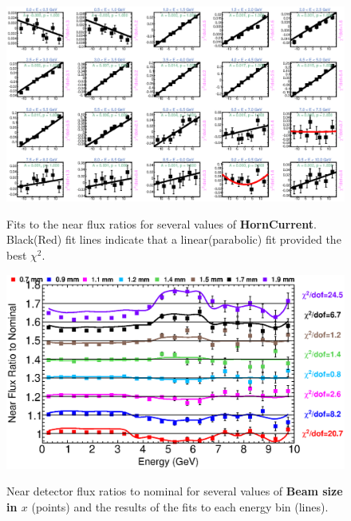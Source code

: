 {\begin{figure}[ht]
  \begin{center}
    {\includegraphics[width=5.0in]{figures/HornCurrent_near_fits.eps}}
  \end{center}
\caption{ Fits to the near flux ratios for several values of {\bf HornCurrent}. Black(Red) fit lines indicate that a linear(parabolic) fit provided the best $\chi^2$. }
\end{figure}

\begin{figure}[ht]
  \begin{center}
    {\includegraphics[width=6.0in]{figures/BeamSigmaX_near_summary.eps}}
  \end{center}
\caption{ Near detector flux ratios to nominal for several values of {\bf Beam size in $x$} (points) and the results of the fits to each energy bin (lines).}
\end{figure}

}
